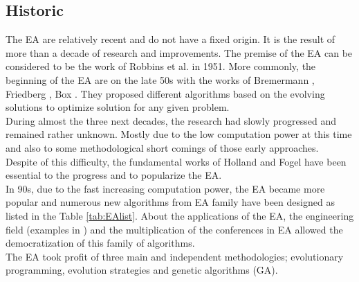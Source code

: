 \subsection{Historic}

The EA are relatively recent and do not have a fixed origin. It is the result of more than a decade of research and improvements.
The premise of the EA can be considered to be the work of Robbins et al.  \cite{184*robbins1951} in 1951. 
More commonly, the beginning of the EA are on the late 50s with the works of Bremermann \cite{185*bremermann1962}, Friedberg \cite{186*friedberg1958}, Box \cite{187*box1957}. They proposed different algorithms based on the evolving solutions to optimize solution for any given problem.\\ 
During almost the three next decades, the research had slowly progressed and remained rather unknown. Mostly due to the low computation power at this time and also to some methodological short comings of
those early approaches. \\
Despite of this difficulty, the fundamental works of Holland \cite{111*Holland1962}  and Fogel  have been essential to the progress and to popularize the EA. \\
In 90s, due to the fast increasing computation power, the EA became more popular and numerous new algorithms from EA family have been designed  as listed in the Table \ref{tab:EAlist}. About the applications of the EA, the engineering field (examples in \cite{10in182*alander1994}) and the multiplication of the conferences in EA allowed the democratization of this family of algorithms.\\
The EA  took profit of three main and independent methodologies; evolutionary programming, evolution strategies and genetic algorithms (GA). 

